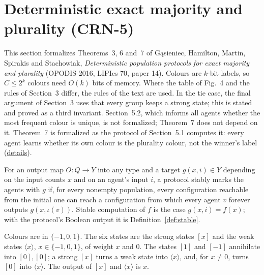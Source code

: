 \section{Deterministic exact majority and plurality (CRN-5)}\label{sec:ghmss-exact-majority}
This section formalizes Theorems~3, 6 and~7 of Gąsieniec, Hamilton, Martin, Spirakis and
Stachowiak, \emph{Deterministic population protocols for exact majority and plurality} (OPODIS
2016, LIPIcs 70, paper 14). Colours are $k$-bit labels, so $C \le 2^k$ colours need $O(k)$ bits of
memory. Where the table of Fig.~4 and the rules of Section~3 differ, the rules of the text are
used. In the tie case, the final argument of Section~3 uses that every group keeps a strong state;
this is stated and proved as a third invariant. Section~5.2, which informs all agents whether the
most frequent colour is unique, is not formalized; Theorem~7 does not depend on it. Theorem~7 is
formalized as the protocol of Section~5.1 computes it: every
agent learns whether its own colour is the plurality colour, not the winner's label
(\href{https://github.com/formal-dynamics/leanamics/blob/main/crn/FORMALIZATION_DIFFERENCES.md#deterministic-exact-majority-and-plurality-exactmajority-crn-5}{details}).

\begin{definition}\label{def:em-marks}
\leanok{}
For an output map $O : Q \to Y$ into any type and a target $g(x, i) \in Y$ depending on the input
counts $x$ and on an agent's input $i$, a protocol stably marks the agents with $g$ if, for every
nonempty population, every configuration reachable from the initial one can reach a configuration
from which every agent $v$ forever outputs $g(x, \iota(v))$. Stable computation of $f$ is the case
$g(x, i) = f(x)$; with the protocol's Boolean output it is Definition~\ref{def:stable}.
\end{definition}

\begin{definition}\label{def:em-static}
\leanok{}
Colours are in $\{-1, 0, 1\}$. The six states are the strong states $[x]$ and the weak states
$\langle x \rangle$, $x \in \{-1, 0, 1\}$, of weight $x$ and $0$. The states $[1]$ and $[-1]$
annihilate into $[0], [0]$; a strong $[x]$ turns a weak state into $\langle x \rangle$, and, for
$x \ne 0$, turns $[0]$ into $\langle x \rangle$. The output of $[x]$ and $\langle x \rangle$ is
$x$.
\end{definition}

